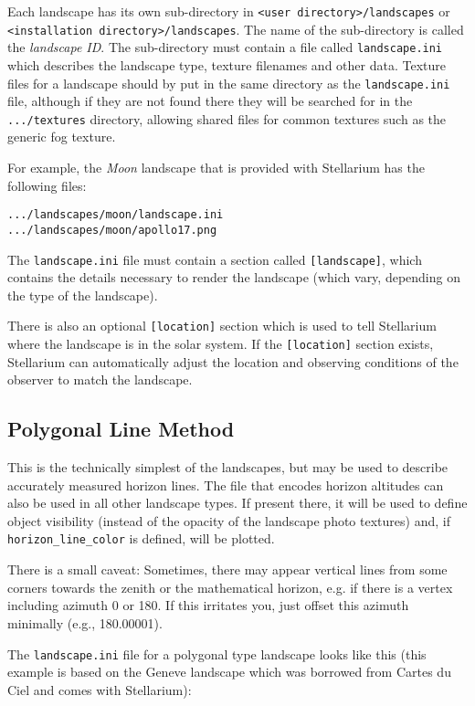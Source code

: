Each landscape has its own sub-directory in
\texttt{\textless{}user\ directory\textgreater{}/landscapes} or
\texttt{\textless{}installation\ directory\textgreater{}/landscapes}.
The name of the sub-directory is called the \emph{landscape ID}. The
sub-directory must contain a file called \texttt{landscape.ini} which
describes the landscape type, texture filenames and other data. Texture
files for a landscape should by put in the same directory as the
\texttt{landscape.ini} file, although if they are not found there they
will be searched for in the \texttt{.../textures} directory, allowing
shared files for common textures such as the generic fog texture.

For example, the \emph{Moon} landscape that is provided with Stellarium
has the following files:

\texttt{.../landscapes/moon/landscape.ini}\\
\texttt{.../landscapes/moon/apollo17.png}

The \texttt{landscape.ini} file must contain a section called
\texttt{{[}landscape{]}}, which contains the details necessary to render
the landscape (which vary, depending on the type of the landscape).

There is also an optional \texttt{{[}location{]}} section which is used
to tell Stellarium where the landscape is in the solar system. If the
\texttt{{[}location{]}} section exists, Stellarium can automatically
adjust the location and observing conditions of the observer to match
the landscape.

\subsection{Polygonal Line Method}\label{polygonal-line-method}

This is the technically simplest of the landscapes, but may be used to
describe accurately measured horizon lines. The file that encodes
horizon altitudes can also be used in all other landscape types. If
present there, it will be used to define object visibility (instead of
the opacity of the landscape photo textures) and, if
\texttt{horizon\_line\_color} is defined, will be plotted.

There is a small caveat: Sometimes, there may appear vertical lines from
some corners towards the zenith or the mathematical horizon, e.g. if
there is a vertex including azimuth 0 or 180. If this irritates you,
just offset this azimuth minimally (e.g., 180.00001).

The \texttt{landscape.ini} file for a polygonal type landscape looks
like this (this example is based on the Geneve landscape which was
borrowed from Cartes du Ciel and comes with Stellarium):

